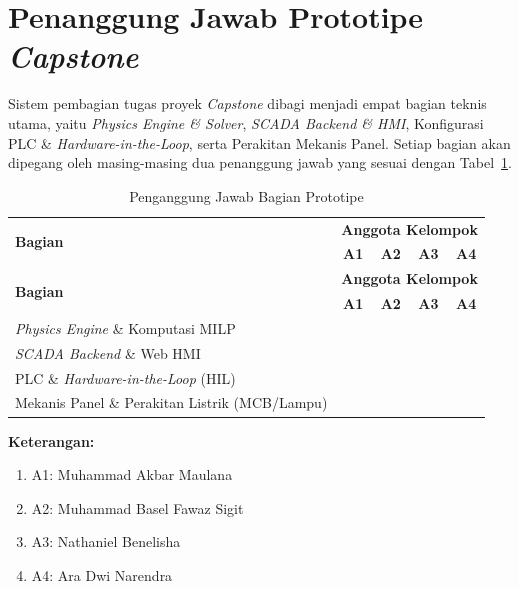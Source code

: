 \section{Penanggung Jawab Prototipe \textit{Capstone}}
\label{sec:Penanggung_Jawab}
Sistem pembagian tugas proyek \textit{Capstone} dibagi menjadi empat bagian teknis utama, yaitu \textit{Physics Engine \& Solver}, \textit{SCADA Backend \& HMI}, Konfigurasi PLC \& \textit{Hardware-in-the-Loop}, serta Perakitan Mekanis Panel. Setiap bagian akan dipegang oleh masing-masing dua penanggung jawab yang sesuai dengan Tabel~\ref{tab:penanggung_jawab}.
\begin{longtable}{|p{6.5cm}|c|c|c|c|}
    \caption{Penganggung Jawab Bagian Prototipe}
    \label{tab:penanggung_jawab}
    \vspace{-0.75em}\\
    \hline
    \multirow{2}{*}{\centering\textbf{Bagian}} & \multicolumn{4}{c|}{\textbf{Anggota Kelompok}} \\ \cline{2-5}
    & \textbf{A1} & \textbf{A2} & \textbf{A3} & \textbf{A4} \\ \hline
    \endfirsthead
    \hline
    \multirow{2}{*}{\centering\textbf{Bagian}} & \multicolumn{4}{c|}{\textbf{Anggota Kelompok}} \\ \cline{2-5}
    & \textbf{A1} & \textbf{A2} & \textbf{A3} & \textbf{A4} \\ \hline
    \endhead
    \textit{Physics Engine} \& Komputasi MILP & \cellcolor{darkgray} &  & & \cellcolor{darkgray} \\ \hline
    \textit{SCADA Backend} \& Web HMI & & \cellcolor{darkgray} & \cellcolor{darkgray} & \\ \hline
    PLC \& \textit{Hardware-in-the-Loop} (HIL) & & & \cellcolor{darkgray} & \cellcolor{darkgray} \\ \hline
    Mekanis Panel \& Perakitan Listrik (MCB/Lampu) & \cellcolor{darkgray} & \cellcolor{darkgray} & &  \\ \hline
\end{longtable}

\vspace{1em}
\noindent\textbf{Keterangan:}
\begin{enumerate}
    \item[a.] A1: Muhammad Akbar Maulana
    \item[b.] A2: Muhammad Basel Fawaz Sigit
    \item[c.] A3: Nathaniel Benelisha
    \item[d.] A4: Ara Dwi Narendra
\end{enumerate}